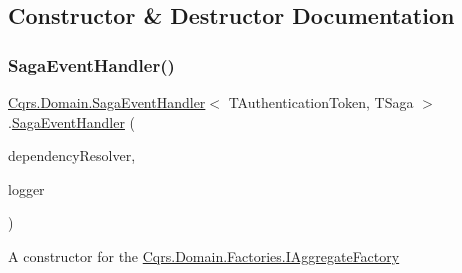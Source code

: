 \subsection{Constructor \& Destructor Documentation}
\mbox{\label{classCqrs_1_1Domain_1_1SagaEventHandler_a4ad68643dd845330a96c71039cf0897f_a4ad68643dd845330a96c71039cf0897f}} 
\subsubsection{\texorpdfstring{Saga\+Event\+Handler()}{SagaEventHandler()}\hspace{0.1cm}{\footnotesize\ttfamily [1/2]}}
{\footnotesize\ttfamily \hyperlink{classCqrs_1_1Domain_1_1SagaEventHandler}{Cqrs.\+Domain.\+Saga\+Event\+Handler}$<$ T\+Authentication\+Token, T\+Saga $>$.\hyperlink{classCqrs_1_1Domain_1_1SagaEventHandler}{Saga\+Event\+Handler} (\begin{DoxyParamCaption}\item[{\hyperlink{interfaceCqrs_1_1Configuration_1_1IDependencyResolver}{I\+Dependency\+Resolver}}]{dependency\+Resolver,  }\item[{I\+Logger}]{logger }\end{DoxyParamCaption})\hspace{0.3cm}{\ttfamily [protected]}}



A constructor for the \hyperlink{interfaceCqrs_1_1Domain_1_1Factories_1_1IAggregateFactory}{Cqrs.\+Domain.\+Factories.\+I\+Aggregate\+Factory} 

\mbox{\label{classCqrs_1_1Domain_1_1SagaEventHandler_a061ebe3676b158d952b26629195df627_a061ebe3676b158d952b26629195df627}} 
